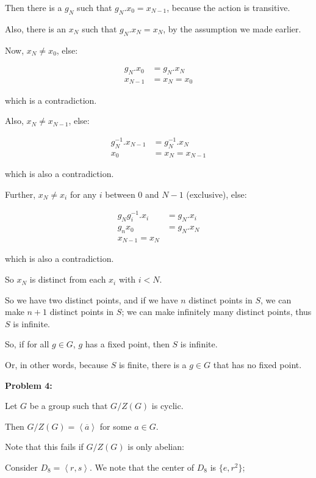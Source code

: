 \documentclass[a4paper,12pt]{article}
\newcommand{\tab}{\hspace{4mm}} %
\newcommand{\shunt}{\vspace{20mm}}
\newcommand{\anbrack}[1]{\left\langle #1 \right\rangle}
\begin{document}
\tab Then there is a $g_N$ such that $g_N.x_0 = x_{N-1}$, because the action is transitive.

\tab Also, there is an $x_N$ such that $g_N.x_N = x_N$, by the assumption we made earlier.

\tab Now, $x_N \neq x_0$, else:

\begin{align*}
g_N.x_0 &= g_N.x_N\\
x_{N-1}&= x_N=x_0
\end{align*}

\tab which is a contradiction.

\tab Also, $x_N \neq x_{N-1}$, else:

\begin{align*}
g_N^{-1}.x_{N-1} &= g_N^{-1}.x_N\\
x_0&= x_N=x_{N-1}
\end{align*} 

\tab which is also a contradiction.

\tab Further, $x_N \neq x_{i}$ for any $i$ between $0$ and $N-1$ (exclusive), else:

\begin{align*}
g_Ng_i^{-1}.x_i &= g_N.x_i\\
g_nx_0 &= g_N.x_N\\
x_{N-1} = x_N
\end{align*} 

\tab which is also a contradiction.

\tab So $x_N$ is distinct from each $x_i$ with $i < N$.

\tab So we have two distinct points, and if we have $n$ distinct points in $S$, we can make $n+1$ distinct points in $S$; we can make infinitely many distinct points, thus $S$ is infinite.

So, if for all $g \in G$, $g$ has a fixed point, then $S$ is infinite.

Or, in other words, because $S$ is finite, there is a $g \in G$ that has no fixed point.

\shunt

{\bf Problem 4:}

Let $G$ be a group such that $G/Z(G)$ is cyclic.

Then $G/Z(G) = \anbrack{\overline{a}}$ for some $a \in G$.


Note that this fails if $G/Z(G)$ is only abelian:

\tab Consider $D_8=\anbrack{r,s}$. We note that the center of $D_8$ is $\{e,r^2\}$;
\end{document}
